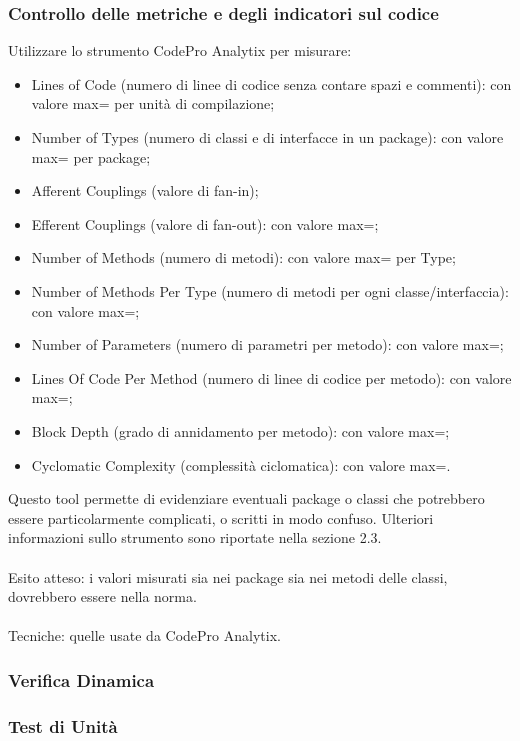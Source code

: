 \subsubsection*{Controllo delle metriche e degli indicatori sul codice}
Utilizzare lo strumento CodePro Analytix per misurare:
\begin{itemize}
  \item Lines of Code (numero di linee di codice senza contare spazi e
  commenti): con valore max= per unit\`a di compilazione;
  \item Number of Types (numero di classi e di interfacce in un package): con
  valore max= per package;
  \item Afferent Couplings (valore di fan-in);
  \item Efferent Couplings (valore di fan-out): con valore max=;
  \item Number of Methods (numero di metodi): con valore max= per Type;
  \item Number of Methods Per Type (numero di metodi per ogni
  classe/interfaccia): con valore max=;
  \item Number of Parameters (numero di parametri per
  metodo): con valore max=;
  \item Lines Of Code Per Method (numero di linee di codice
  per metodo): con valore max=;
  \item Block Depth (grado di annidamento per metodo): con valore max=;
  \item Cyclomatic Complexity (complessit\`a ciclomatica): con valore max=.
\end{itemize}
Questo tool permette di evidenziare eventuali package o classi che
potrebbero essere particolarmente complicati, o scritti in modo confuso.
Ulteriori informazioni sullo strumento sono riportate nella sezione 2.3.\\\\ 
Esito atteso: i valori misurati sia nei package sia nei metodi delle
classi, dovrebbero essere nella norma.\\\\ 
Tecniche: quelle usate da CodePro Analytix.

\subsubsection{Verifica Dinamica}

\subsubsection*{Test di Unit\`a}


